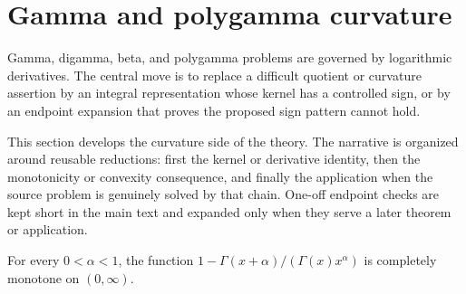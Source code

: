 \section{Gamma and polygamma curvature}
Gamma, digamma, beta, and polygamma problems are governed by logarithmic derivatives.  The central move is to replace a difficult quotient or curvature assertion by an integral representation whose kernel has a controlled sign, or by an endpoint expansion that proves the proposed sign pattern cannot hold.

This section develops the curvature side of the theory.  The narrative is organized around reusable reductions: first the kernel or derivative identity, then the monotonicity or convexity consequence, and finally the application when the source problem is genuinely solved by that chain.  One-off endpoint checks are kept short in the main text and expanded only when they serve a later theorem or application.
\begin{theorem}
\label{res:simon-gamma-quotient-complement-cm}
For every \(0<\alpha<1\), the function \(1-\Gamma(x+\alpha)/(\Gamma(x)x^\alpha)\) is completely monotone on \((0,\infty)\).
\end{theorem}
